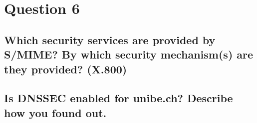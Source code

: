 \documentclass{report}
\begin{document}
	\section{Question 6}
	\startsection
		\renewcommand{\thesubsection}{\thesection.\Alph{subsection}}
		\subsection{Which security services are provided by S/MIME? By which security mechanism(s) are they provided? (X.800)}
		\startsubsection
		\closesection
		\subsection{Is DNSSEC enabled for unibe.ch? Describe how you found out.}
		\startsubsection
		\closesection
	\closesection
\end{document}
